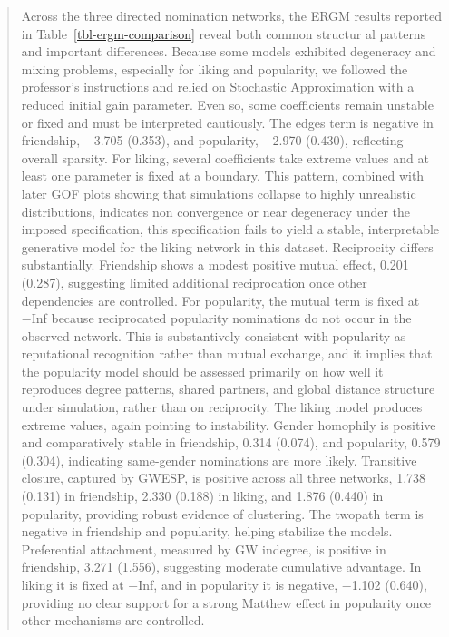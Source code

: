 \documentclass[
  letterpaper,
  DIV=11,
  numbers=noendperiod]{scrartcl}
\begin{document}
\begin{quote}
Across the three directed nomination networks, the ERGM results reported
in Table~\ref{tbl-ergm-comparison} reveal both common structur al
patterns and important differences. Because some models exhibited
degeneracy and mixing problems, especially for liking and popularity, we
followed the professor's instructions and relied on Stochastic
Approximation with a reduced initial gain parameter. Even so, some
coefficients remain unstable or fixed and must be interpreted
cautiously. The edges term is negative in friendship, −3.705 (0.353),
and popularity, −2.970 (0.430), reflecting overall sparsity. For liking,
several coefficients take extreme values and at least one parameter is
fixed at a boundary. This pattern, combined with later GOF plots showing
that simulations collapse to highly unrealistic distributions, indicates
non convergence or near degeneracy under the imposed specification, this
specification fails to yield a stable, interpretable generative model
for the liking network in this dataset. Reciprocity differs
substantially. Friendship shows a modest positive mutual effect, 0.201
(0.287), suggesting limited additional reciprocation once other
dependencies are controlled. For popularity, the mutual term is fixed at
−Inf because reciprocated popularity nominations do not occur in the
observed network. This is substantively consistent with popularity as
reputational recognition rather than mutual exchange, and it implies
that the popularity model should be assessed primarily on how well it
reproduces degree patterns, shared partners, and global distance
structure under simulation, rather than on reciprocity. The liking model
produces extreme values, again pointing to instability. Gender homophily
is positive and comparatively stable in friendship, 0.314 (0.074), and
popularity, 0.579 (0.304), indicating same-gender nominations are more
likely. Transitive closure, captured by GWESP, is positive across all
three networks, 1.738 (0.131) in friendship, 2.330 (0.188) in liking,
and 1.876 (0.440) in popularity, providing robust evidence of
clustering. The twopath term is negative in friendship and popularity,
helping stabilize the models. Preferential attachment, measured by GW
indegree, is positive in friendship, 3.271 (1.556), suggesting moderate
cumulative advantage. In liking it is fixed at −Inf, and in popularity
it is negative, −1.102 (0.640), providing no clear support for a strong
Matthew effect in popularity once other mechanisms are controlled.
\end{quote}
\end{document}
